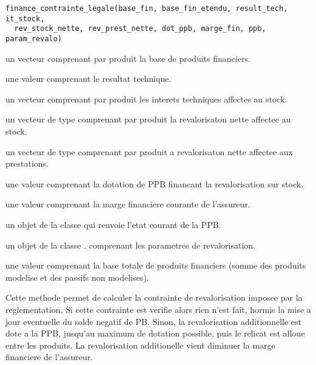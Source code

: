 \documentclass[a4paper]{book}
\begin{document}
%
\begin{Usage}
\begin{verbatim}
finance_contrainte_legale(base_fin, base_fin_etendu, result_tech, it_stock,
  rev_stock_nette, rev_prest_nette, dot_ppb, marge_fin, ppb, param_revalo)
\end{verbatim}
\end{Usage}
%
\begin{Arguments}
\begin{ldescription}
\item[\code{base\_fin}] un vecteur  comprenant par produit la base de produits financiers.

\item[\code{result\_tech}] une valeur  comprenant le resultat technique.

\item[\code{it\_stock}] un vecteur  comprenant par produit les interets techniques affectes au stock.

\item[\code{rev\_stock\_nette}] un vecteur de type  comprenant par produit la revalorisaton nette
affectee au stock.

\item[\code{rev\_prest\_nette}] un vecteur de type  comprenant par produit a revalorisaton nette
affectee aux prestations.

\item[\code{dot\_ppb}] une valeur  comprenant la dotation de PPB financant la revalorisation
sur stock.

\item[\code{marge\_fin}] une valeur  comprenant la marge financiere courante de l'assureur.

\item[\code{ppb}] un objet de la classe  qui renvoie l'etat courant de la PPB.

\item[\code{param\_revalo}] un objet de la classe .
comprenant les parametres de revalorisation.

\item[\code{base\_fin\_entendu}] une valeur  comprenant la base totale de produits financiers
(somme des produits modelise et des  passifs non modelises).
\end{ldescription}
\end{Arguments}
%
\begin{Details}\relax
Cette methode permet de calculer la contrainte de revalorisation imposee par la reglementation. Si cette
contrainte est verifie alors rien n'est fait, hormis la mise a jour eventuelle du solde negatif de PB. Sinon, la
revalorisation additionnelle est dote a la PPB, jusqu'au maximum de dotation possible, puis le relicat est alloue
entre les produits. La revalorisation additionelle vient diminuer la marge financiere de l'assureur.
\end{Details}
\end{document}
